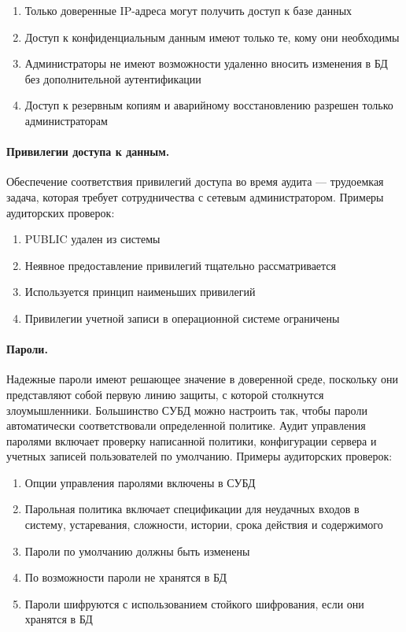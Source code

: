 \begin{enumerate}
	\item Только доверенные IP-адреса могут получить доступ к базе данных
	\item Доступ к конфиденциальным данным имеют только те, кому они необходимы
	\item Администраторы не имеют возможности удаленно вносить изменения в БД без дополнительной аутентификации
	\item Доступ к резервным копиям и аварийному восстановлению разрешен только администраторам
\end{enumerate}

\paragraph{Привилегии доступа к данным.}

Обеспечение соответствия привилегий доступа во время аудита — трудоемкая задача, которая требует сотрудничества с сетевым администратором. Примеры аудиторских проверок:

\begin{enumerate}
	\item PUBLIC удален из системы
	\item Неявное предоставление привилегий тщательно рассматривается
	\item Используется принцип наименьших привилегий
	\item Привилегии учетной записи в операционной системе ограничены
\end{enumerate}

\paragraph{Пароли.}

Надежные пароли имеют решающее значение в доверенной среде, поскольку они представляют собой первую линию защиты, с которой столкнутся злоумышленники. Большинство СУБД можно настроить так, чтобы пароли автоматически соответствовали определенной политике. Аудит управления паролями включает проверку написанной политики, конфигурации сервера и учетных записей пользователей по умолчанию. Примеры аудиторских проверок:

\begin{enumerate}
	\item Опции управления паролями включены в СУБД
	\item Парольная политика включает спецификации для неудачных входов в систему, устаревания, сложности, истории, срока действия и содержимого
	\item Пароли по умолчанию должны быть изменены
	\item По возможности пароли не хранятся в БД
	\item Пароли шифруются с использованием стойкого шифрования, если они хранятся в БД
\end{enumerate}

